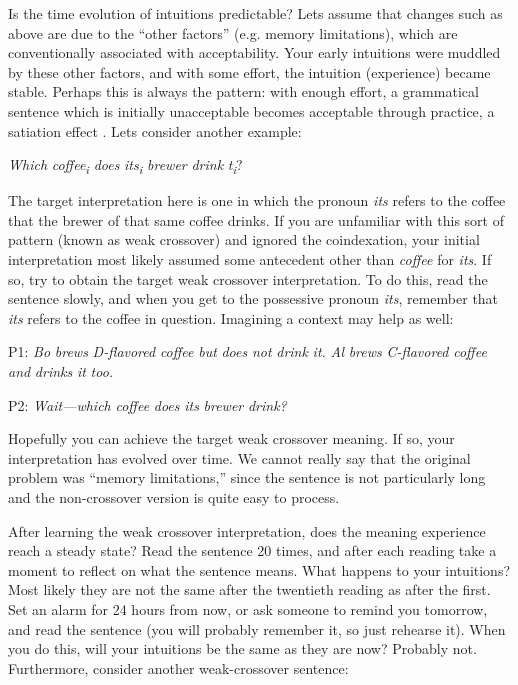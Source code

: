   Is the time evolution of intuitions predictable? Lets assume that changes such as above are due to the “other factors” (e.g. memory limitations), which are conventionally associated with acceptability. Your early intuitions were muddled by these other factors, and with some effort, the intuition (experience) became stable. Perhaps this is always the pattern: with enough effort, a grammatical sentence which is initially unacceptable becomes acceptable through practice, a satiation effect \citep{Snyder2000}. Lets consider another example:

    \textit{Which} \textit{coffee\textsubscript{i}} \textit{does} \textit{its\textsubscript{i}} \textit{brewer} \textit{drink} \textit{t\textsubscript{i}}?

  The target interpretation here is one in which the pronoun \textit{its} refers to the coffee that the brewer of that same coffee drinks. If you are unfamiliar with this sort of pattern (known as weak crossover) and ignored the coindexation, your initial interpretation most likely assumed some antecedent other than \textit{coffee} for \textit{its}. If so, try to obtain the target weak crossover interpretation. To do this, read the sentence slowly, and when you get to the possessive pronoun \textit{its}, remember that \textit{its} refers to the coffee in question. Imagining a context may help as well:

P1: \textit{Bo} \textit{brews} \textit{D-flavored} \textit{coffee} \textit{but} \textit{does} \textit{not} \textit{drink} \textit{it.} \textit{Al} \textit{brews} \textit{C-flavored} \textit{coffee} \textit{and} \textit{drinks} \textit{it} \textit{too.} 

P2: \textit{Wait—which} \textit{coffee} \textit{does} \textit{its} \textit{brewer} \textit{drink?}

  Hopefully you can achieve the target weak crossover meaning. If so, your interpretation has evolved over time. We cannot really say that the original problem was “memory limitations,” since the sentence is not particularly long and the non-crossover version is quite easy to process. 

  After learning the weak crossover interpretation, does the meaning experience reach a steady state? Read the sentence 20 times, and after each reading take a moment to reflect on what the sentence means. What happens to your intuitions? Most likely they are not the same after the twentieth reading as after the first. Set an alarm for 24 hours from now, or ask someone to remind you tomorrow, and read the sentence (you will probably remember it, so just rehearse it). When you do this, will your intuitions be the same as they are now? Probably not. Furthermore, consider another weak-crossover sentence: 

